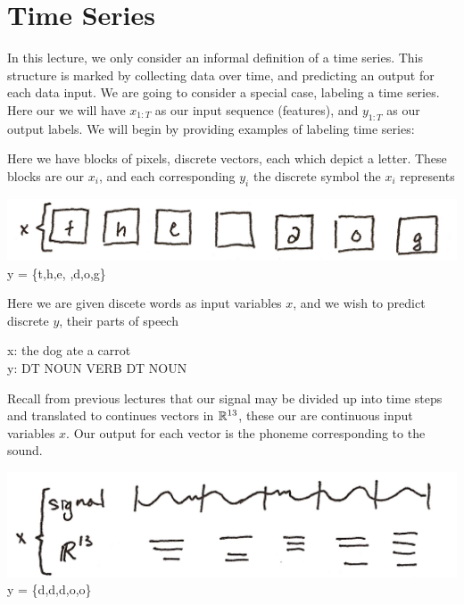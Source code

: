 \documentclass{article}
\begin{document}
\section{Time Series}
In this lecture, we only consider an informal definition of a time series. This structure is marked by collecting data over time, and predicting an output for each data input.
We are going to consider a special case, labeling a time series. Here our we will have $x_{1:T}$ as our input sequence (features), and $y_{1:T}$ as our output labels. We will begin by providing examples of labeling time series:
\begin{example}[OCR]
Here we have blocks of pixels, discrete vectors, each which depict a letter. These blocks are our $x_i$, and each corresponding $y_i$ the discrete symbol the $x_i$ represents
\begin{center}
\includegraphics[scale=.1]{OCR} \\
y = \{t,h,e, ,d,o,g\}
\end{center}
\end{example}
\begin{example}[NLP]
Here we are given discete words as input variables $x$, and we wish to predict discrete $y$, their parts of speech
\begin{center}
x: the dog ate a carrot \\
y: DT NOUN VERB DT NOUN
\end{center}
\end{example}
\begin{example}
Recall from previous lectures that our signal may be divided up into time steps and translated to continues vectors in $\mathbb{R}^{13}$, these our are continuous input variables $x$. Our output for each vector is the phoneme corresponding to the sound.
\begin{center}
\includegraphics[scale=.1]{SpeechRec} \\
y = \{d,d,d,o,o\}
\end{center}
\end{example}
\end{document}
